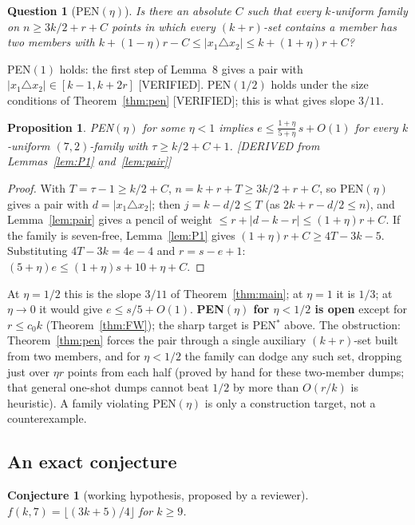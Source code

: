 \documentclass[11pt]{article}
\newtheorem{proposition}[theorem]{Proposition}
\newtheorem{conjecture}[theorem]{Conjecture}
\newtheorem{question}[theorem]{Question}
\theoremstyle{definition}
\newcommand{\st}[1]{\textsf{\small[#1]}}
\begin{document}
\begin{question}[PEN$(\eta)$]\label{q:pen}
Is there an absolute $C$ such that every $k$-uniform family on $n\ge3k/2+r+C$ points in which every $(k+r)$-set
contains a member has two members with $k+(1-\eta)r-C\le|x_1\triangle x_2|\le k+(1+\eta)r+C$?
\end{question}
PEN$(1)$ holds: the first step of Lemma~8 gives a pair with $|x_1\triangle x_2|\in[k-1,k+2r]$ \st{VERIFIED}. PEN$(1/2)$
holds under the size conditions of Theorem~\ref{thm:pen} \st{VERIFIED}; this is what gives slope $3/11$.
\begin{proposition}\label{prop:PEN}
PEN$(\eta)$ for some $\eta<1$ implies $e\le\frac{1+\eta}{5+\eta}\,s+O(1)$ for every $k$-uniform $(7,2)$-family with $\tau\ge k/2+C+1$.
\st{DERIVED from Lemmas~\ref{lem:P1} and~\ref{lem:pair}}
\end{proposition}
\begin{proof}
With $T=\tau-1\ge k/2+C$, $n=k+r+T\ge3k/2+r+C$, so PEN$(\eta)$ gives a pair with $d=|x_1\triangle x_2|$; then
$j=k-d/2\le T$ (as $2k+r-d/2\le n$), and Lemma~\ref{lem:pair} gives a pencil of weight $\le r+|d-k-r|\le(1+\eta)r+C$. If the family is seven-free,
Lemma~\ref{lem:P1} gives $(1+\eta)r+C\ge4T-3k-5$. Substituting $4T-3k=4e-4$ and $r=s-e+1$:
$(5+\eta)e\le(1+\eta)s+10+\eta+C$.
\end{proof}
At $\eta=1/2$ this is the slope $3/11$ of Theorem~\ref{thm:main}; at $\eta=1$ it is $1/3$; at $\eta\to0$ it would give
$e\le s/5+O(1)$. \textbf{PEN$(\eta)$ for $\eta<1/2$ is open} except for $r\le c_0k$ (Theorem~\ref{thm:FW}); the sharp target is PEN$^*$ above. The obstruction: Theorem~\ref{thm:pen} forces the pair
through a single auxiliary $(k+r)$-set built from two members, and for $\eta<1/2$ the family can dodge any such set,
dropping just over $\eta r$ points from each half (proved by hand for these two-member dumps; that general one-shot
dumps cannot beat $1/2$ by more than $O(r/k)$ is heuristic). A family violating PEN$(\eta)$ is only a construction
target, not a counterexample.

\subsection{An exact conjecture}

\begin{conjecture}[working hypothesis, proposed by a reviewer]\label{conj:2}
$f(k,7)=\lfloor(3k+5)/4\rfloor$ for $k\ge9$.
\end{conjecture}
\end{document}
